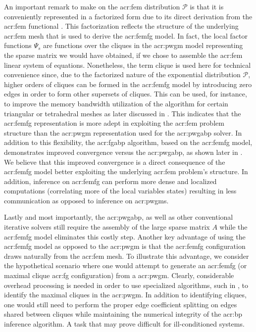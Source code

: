 An important remark to make on the \gls{acr:fem} distribution $\mathcal{P}$ is that it is conveniently represented in a factorized form due to its direct derivation from the \gls{acr:fem} functional .
This factorization reflects the structure of the underlying \gls{acr:fem} mesh that is used to derive the \gls{acr:femfg} model.
In fact, the local factor functions $\Psi_s$ are functions over the cliques in the \gls{acr:pwgm} model representing the sparse matrix we would have obtained, if we chose to assemble the \gls{acr:fem} linear system of equations.
Nonetheless, the term clique is used here for technical convenience since, due to the factorized nature of the exponential distribution $\mathcal{P}$, higher orders of cliques can be formed in the \gls{acr:femfg} model by introducing zero edges in order to form other supersets of cliques.
This can be used, for instance, to improve the memory bandwidth utilization of the algorithm for certain triangular or tetrahedral meshes as later discussed in .
This indicates that the \gls{acr:femfg} representation is more adept in exploiting the \gls{acr:fem} problem structure than the \gls{acr:pwgm} representation used for the \gls{acr:pwgabp} solver.
In addition to this flexibility, the \gls{acr:fgabp} algorithm, based on the \gls{acr:femfg} model, demonstrates improved convergence versus the \gls{acr:pwgabp}, as shown later in .
We believe that this improved convergence is a direct consequence of the \gls{acr:femfg} model better exploiting the underlying \gls{acr:fem} problem's structure.
In addition, inference on \gls{acr:femfg} can perform more dense and localized computations (correlating more of the local variables states) resulting in less communication as opposed to inference on \glspl{acr:pwgm}.


Lastly and most importantly, the \gls{acr:pwgabp}, as well as other conventional iterative solvers still require the assembly of the large sparse matrix $A$ while the \gls{acr:femfg} model eliminates this costly step.
Another key advantage of using the \gls{acr:femfg} model as opposed to the \gls{acr:pwgm} is that the \gls{acr:femfg} configuration draws naturally from the \gls{acr:fem} mesh.
To illustrate this advantage, we consider the hypothetical scenario where one would attempt to generate an \gls{acr:femfg} (or maximal clique \gls{acr:fg} configuration) from a \gls{acr:pwgm}.
Clearly, considerable overhead processing is needed in order to use specialized algorithms, such in \cite{bib:BronK1973,bib:TomitaTT2006,bib:Akkoyunlu1973,bib:Szabo2011,bib:Darehmiraki2009}, to identify the maximal cliques in the \gls{acr:pwgm}.
In addition to identifying cliques, one would still need to perform the proper edge coefficient splitting on edges shared between cliques while maintaining the numerical integrity of the \gls{acr:bp} inference algorithm.
A task that may prove difficult for ill-conditioned systems.

